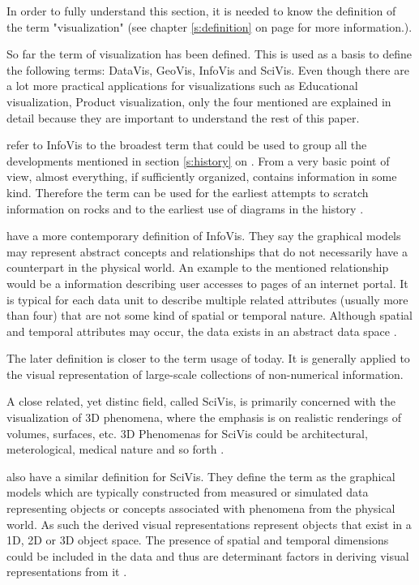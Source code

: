 In order to fully understand this section, it is needed to know the definition of the term "visualization" (see chapter \ref{s:definition} on page \pageref{s:definition} for more information.).

So far the term of visualization has been defined. This is used as a basis to define the following terms: \ac{DataVis}, \ac{GeoVis}, \ac{InfoVis} and \ac{SciVis}. Even though there are a lot more practical applications for visualizations such as Educational visualization, Product visualization, only the four mentioned are explained in detail because they are important to understand the rest of this paper.

\begin{enumerate}

\citeauthor{Friendly.2001} refer to \ac{InfoVis} to the broadest term that could be used to group all the developments mentioned in section \ref{s:history} on \pageref{s:history}. From a very basic point of view, almost everything, if sufficiently organized, contains information in some kind. Therefore the term can be used for the earliest attempts to scratch information on rocks and to the earliest use of diagrams in the history .

\citeauthor{Ferreira2003} have a more contemporary definition of \ac{InfoVis}. They say the graphical models may represent abstract concepts and relationships that do not necessarily have a counterpart in the physical world. An example to the mentioned relationship would be a information describing user accesses to pages of an internet portal. It is typical for each data unit to describe multiple related attributes (usually more than four) that are not some kind of spatial or temporal nature. Although spatial and temporal attributes may occur, the data exists in an abstract data space .

The later definition is closer to the term usage of today. It is generally applied to the visual representation of large-scale collections of non-numerical information.

A close related, yet distinc field, called \ac{SciVis}, is primarily concerned with the visualization of 3D phenomena, where the emphasis is on realistic renderings of volumes, surfaces, etc. 3D Phenomenas for \ac{SciVis} could be architectural, meterological, medical nature and so forth .

\citeauthor{Ferreira2003} also have a similar definition for \ac{SciVis}. They define the term as the graphical models which are typically constructed from measured or simulated data representing objects or concepts associated with phenomena from the physical world. As such the derived visual representations represent objects that exist in a 1D, 2D or 3D object space. The presence of spatial and temporal dimensions could be included in the data and thus are determinant factors in deriving visual representations from it .


\end{enumerate}
